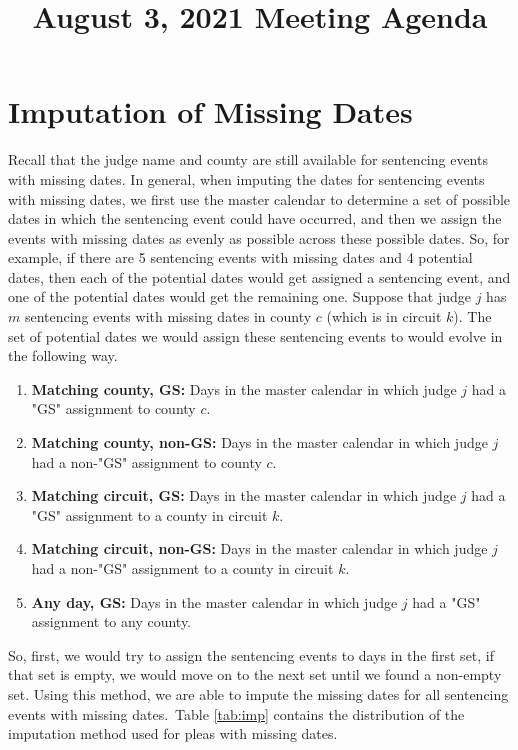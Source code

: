 \documentclass[11pt]{article}
\title{August 3, 2021 Meeting Agenda}
\begin{document}
\maketitle

\section{Imputation of Missing Dates}
  Recall that the judge name and county are still available for sentencing events with missing dates. In general, when imputing the dates for sentencing events with missing dates, we first use the master calendar to determine a set of possible dates in which the sentencing event could have occurred, and then we assign the events with missing dates as evenly as possible across these possible dates. So, for example, if there are 5 sentencing events with missing dates and 4 potential dates, then each of the potential dates would get assigned a sentencing event, and one of the potential dates would get the remaining one.
  Suppose that judge $j$ has $m$ sentencing events with missing dates in county $c$ (which is in circuit $k$). The set of potential dates we would assign these sentencing events to would evolve in the following way.

  \begin{enumerate}
    \item \textbf{Matching county, GS:} Days in the master calendar in which judge $j$ had a "GS" assignment to county $c$.
    \item \textbf{Matching county, non-GS:} Days in the master calendar in which judge $j$ had a non-"GS" assignment to county $c$.
    \item \textbf{Matching circuit, GS:} Days in the master calendar in which judge $j$ had a "GS" assignment to a county in circuit $k$.
    \item \textbf{Matching circuit, non-GS:} Days in the master calendar in which judge $j$ had a non-"GS" assignment to a county in circuit $k$.
    \item \textbf{Any day, GS:} Days in the master calendar in which judge $j$ had a "GS" assignment to any county.
  \end{enumerate}

  So, first, we would try to assign the sentencing events to days in the first set, if that set is empty, we would move on to the next set until we found a non-empty set. Using this method, we are able to impute the missing dates for all sentencing events with missing dates. Table \ref{tab:imp} contains the distribution of the imputation method used for pleas with missing dates.
\end{document}
